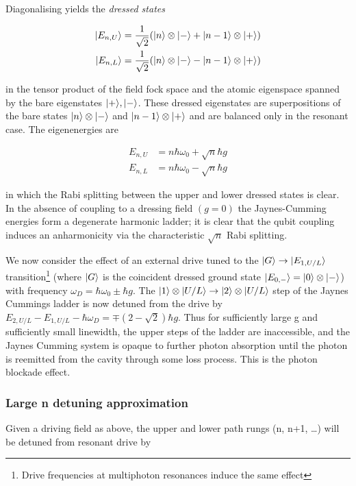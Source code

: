 Diagonalising yields the \emph{dressed states}

\begin{align}
  | E_{n, U} \rangle & = \frac{1}{\sqrt{2}} (| n \rangle \otimes| - \rangle+| n-1 \rangle \otimes| + \rangle) \\
  | E_{n, L} \rangle & = \frac{1}{\sqrt{2}} (| n \rangle \otimes| - \rangle-| n-1 \rangle \otimes| + \rangle)
\end{align}

in the tensor product of the field fock space and the atomic eigenspace spanned by the bare eigenstates $| + \rangle, | - \rangle$. These dressed eigenstates are superpositions of the bare states $| n \rangle \otimes| - \rangle$ and $| n-1 \rangle \otimes| + \rangle$ and are balanced only in the resonant case. The eigenenergies are

\begin{align}
  E_{n, U} &= n \hbar \omega_0 + \sqrt{n} \hbar g \\
  E_{n, L} &= n \hbar \omega_0 - \sqrt{n} \hbar g
\end{align}

in which the Rabi splitting between the upper and lower dressed states is clear. In the absence of coupling to a dressing field $(g=0)$ the Jaynes-Cumming energies form a degenerate harmonic ladder; it is clear that the qubit coupling induces an anharmonicity via the characteristic $\sqrt{n}$ Rabi splitting.

We now consider the effect of an external drive tuned to the $| G \rangle \rightarrow | E_{1, U/L} \rangle$ transition\footnote{Drive frequencies at multiphoton resonances induce the same effect} (where $| G \rangle$ is the coincident dressed ground state $| E_{0, -} \rangle = | 0 \rangle \otimes| - \rangle$) with frequency $\omega_D = \hbar \omega_0 \pm \hbar g$.
The $| 1 \rangle \otimes| U/L \rangle \rightarrow | 2 \rangle \otimes| U/L \rangle$ step of the Jaynes Cummings ladder is now detuned from the drive by $E_{2, U/L} - E_{1, U/L} - \hbar \omega_D =  \mp(2-\sqrt{2}) \hbar g$. Thus for sufficiently large g and sufficiently small linewidth, the upper steps of the ladder are inaccessible, and the Jaynes Cumming system is opaque to further photon absorption until the photon is reemitted from the cavity through some loss process. This is the photon blockade effect.
\subsubsection{Large n detuning approximation}\cite{Alsing1990}
Given a driving field as above, the upper and lower path rungs (n, n+1, \dots) will be detuned from resonant drive by

